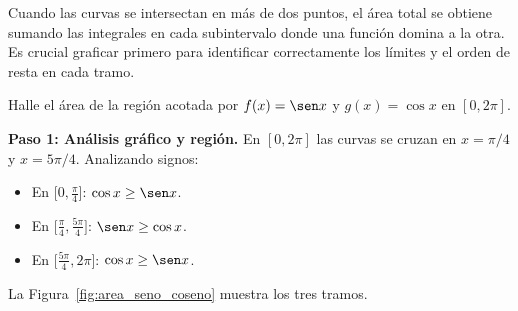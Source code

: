 \begin{rem}
Cuando las curvas se intersectan en más de dos puntos, el área total se
obtiene sumando las integrales en cada subintervalo donde una función
domina a la otra. Es crucial graficar primero para identificar correctamente
los límites y el orden de resta en cada tramo.
\end{rem}

\begin{example}
Halle el área de la región acotada por $f(x)=\sen x$ y $g(x)=\cos x$ en
$[0,2\pi]$.

\begin{myproof}
\textbf{Paso 1: Análisis gráfico y región.}
En $[0,2\pi]$ las curvas se cruzan en $x=\pi/4$ y $x=5\pi/4$.
Analizando signos:
\begin{itemize}
  \item En $\bigl[0,\tfrac{\pi}{4}\bigr]$: $\cos x\geq\sen x$.
  \item En $\bigl[\tfrac{\pi}{4},\tfrac{5\pi}{4}\bigr]$: $\sen x\geq\cos x$.
  \item En $\bigl[\tfrac{5\pi}{4},2\pi\bigr]$: $\cos x\geq\sen x$.
\end{itemize}
La Figura~\ref{fig:area_seno_coseno} muestra los tres tramos.


\end{myproof}
\end{example}
